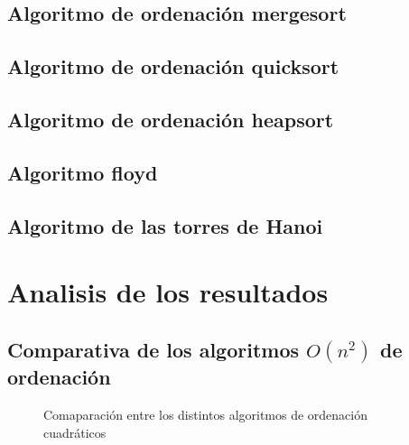 \documentclass{article}
\begin{document}
\subsection{Algoritmo de ordenación mergesort}

\subsection{Algoritmo de ordenación quicksort}

\subsection{Algoritmo de ordenación heapsort}

\subsection{Algoritmo floyd}

\subsection{Algoritmo de las torres de Hanoi}


\section{Analisis de los resultados}

\subsection{Comparativa de los algoritmos $O(n^2)$ de ordenación}

\begin{figure}[H]
  \centering   
      \subfloat {%

        
        
      }
      



\caption{Comaparación entre los distintos algoritmos de ordenación cuadráticos}
\end{figure}
\end{document}
